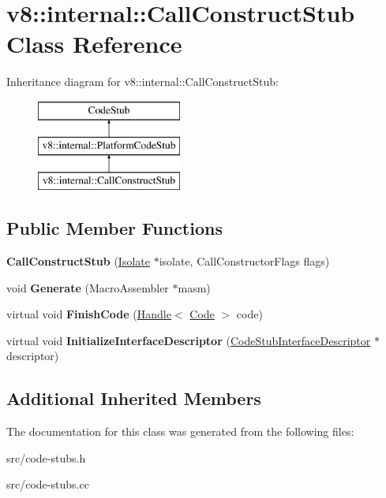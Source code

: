 \hypertarget{classv8_1_1internal_1_1_call_construct_stub}{}\section{v8\+:\+:internal\+:\+:Call\+Construct\+Stub Class Reference}
\label{classv8_1_1internal_1_1_call_construct_stub}
Inheritance diagram for v8\+:\+:internal\+:\+:Call\+Construct\+Stub\+:\begin{figure}[H]
\begin{center}
\leavevmode
\includegraphics[height=3.000000cm]{classv8_1_1internal_1_1_call_construct_stub}
\end{center}
\end{figure}
\subsection*{Public Member Functions}
\begin{DoxyCompactItemize}
\item 
\hypertarget{classv8_1_1internal_1_1_call_construct_stub_a60bf0ce16afad54e058bb5dc1e34bfa0}{}{\bfseries Call\+Construct\+Stub} (\hyperlink{classv8_1_1internal_1_1_isolate}{Isolate} $\ast$isolate, Call\+Constructor\+Flags flags)\label{classv8_1_1internal_1_1_call_construct_stub_a60bf0ce16afad54e058bb5dc1e34bfa0}

\item 
\hypertarget{classv8_1_1internal_1_1_call_construct_stub_acbed2d59402eb04291d9bf5ebc4e07d4}{}void {\bfseries Generate} (Macro\+Assembler $\ast$masm)\label{classv8_1_1internal_1_1_call_construct_stub_acbed2d59402eb04291d9bf5ebc4e07d4}

\item 
\hypertarget{classv8_1_1internal_1_1_call_construct_stub_a25e78a6f6319350d3482e5da83dbe3e2}{}virtual void {\bfseries Finish\+Code} (\hyperlink{classv8_1_1internal_1_1_handle}{Handle}$<$ \hyperlink{classv8_1_1internal_1_1_code}{Code} $>$ code)\label{classv8_1_1internal_1_1_call_construct_stub_a25e78a6f6319350d3482e5da83dbe3e2}

\item 
\hypertarget{classv8_1_1internal_1_1_call_construct_stub_ae8f287cef84cdb19f81028584cb4a7ad}{}virtual void {\bfseries Initialize\+Interface\+Descriptor} (\hyperlink{classv8_1_1internal_1_1_code_stub_interface_descriptor}{Code\+Stub\+Interface\+Descriptor} $\ast$descriptor)\label{classv8_1_1internal_1_1_call_construct_stub_ae8f287cef84cdb19f81028584cb4a7ad}

\end{DoxyCompactItemize}
\subsection*{Additional Inherited Members}


The documentation for this class was generated from the following files\+:\begin{DoxyCompactItemize}
\item 
src/code-\/stubs.\+h\item 
src/code-\/stubs.\+cc\end{DoxyCompactItemize}
